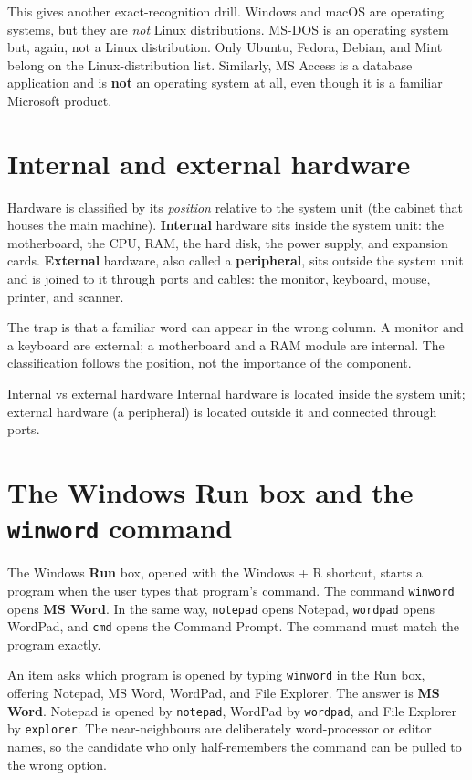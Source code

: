 This gives another exact-recognition drill. Windows and macOS are operating
systems, but they are \emph{not} Linux distributions. MS-DOS is an operating
system but, again, not a Linux distribution. Only Ubuntu, Fedora, Debian, and
Mint belong on the Linux-distribution list. Similarly, MS Access is a
database application and is \textbf{not} an operating system at all, even
though it is a familiar Microsoft product.

\section{Internal and external hardware}
Hardware is classified by its \emph{position} relative to the system unit
(the cabinet that houses the main machine). \textbf{Internal} hardware sits
inside the system unit: the motherboard, the CPU, RAM, the hard disk, the
power supply, and expansion cards. \textbf{External} hardware, also called a
\textbf{peripheral}, sits outside the system unit and is joined to it through
ports and cables: the monitor, keyboard, mouse, printer, and scanner.

The trap is that a familiar word can appear in the wrong column. A monitor
and a keyboard are external; a motherboard and a RAM module are internal. The
classification follows the position, not the importance of the component.

\begin{definitionbox}{Internal vs external hardware}
Internal hardware is located inside the system unit; external hardware
(a peripheral) is located outside it and connected through ports.
\end{definitionbox}

\section{The Windows Run box and the \texttt{winword} command}
The Windows \textbf{Run} box, opened with the Windows + R shortcut, starts a
program when the user types that program's command. The command
\texttt{winword} opens \textbf{MS Word}. In the same way,
\texttt{notepad} opens Notepad, \texttt{wordpad} opens WordPad, and
\texttt{cmd} opens the Command Prompt. The command must match the program
exactly.

\begin{example}
An item asks which program is opened by typing \texttt{winword} in the Run
box, offering Notepad, MS Word, WordPad, and File Explorer. The answer is
\textbf{MS Word}. Notepad is opened by \texttt{notepad}, WordPad by
\texttt{wordpad}, and File Explorer by \texttt{explorer}. The near-neighbours
are deliberately word-processor or editor names, so the candidate who only
half-remembers the command can be pulled to the wrong option.
\end{example}


